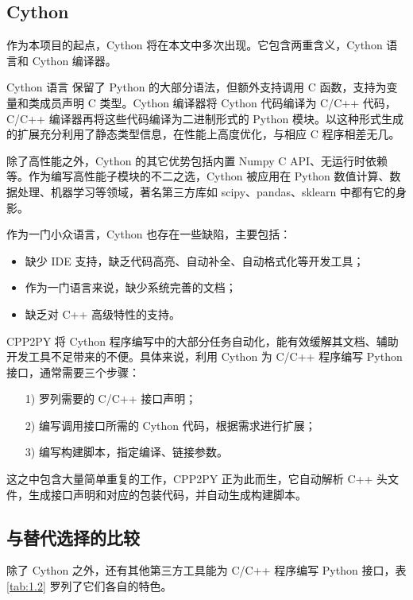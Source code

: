 \subsection{Cython}

作为本项目的起点，Cython 将在本文中多次出现。它包含两重含义，Cython 语言和 Cython 编译器。

Cython 语言\cite{O2015Cython, cython} 保留了 Python 的大部分语法，但额外支持调用 C 函数，支持为变量和类成员声明 C 类型。Cython 编译器将 Cython 代码编译为 C/C++ 代码，C/C++ 编译器再将这些代码编译为二进制形式的 Python 模块。以这种形式生成的扩展充分利用了静态类型信息，在性能上高度优化，与相应 C 程序相差无几。

除了高性能之外，Cython 的其它优势包括内置 Numpy C API、无运行时依赖等。作为编写高性能子模块的不二之选，Cython 被应用在 Python 数值计算、数据处理、机器学习等领域，著名第三方库如 scipy、pandas、sklearn 中都有它的身影。

作为一门小众语言，Cython 也存在一些缺陷，主要包括：

\begin{itemize}
    \item 缺少 IDE 支持，缺乏代码高亮、自动补全、自动格式化等开发工具；
    \item 作为一门语言来说，缺少系统完善的文档；
    \item 缺乏对 C++ 高级特性的支持。
\end{itemize}

CPP2PY 将 Cython 程序编写中的大部分任务自动化，能有效缓解其文档、辅助开发工具不足带来的不便。具体来说，利用 Cython 为 C/C++ 程序编写 Python 接口，通常需要三个步骤：

\begin{itemize}
    \item [1)] 罗列需要的 C/C++ 接口声明；
    \item [2)] 编写调用接口所需的 Cython 代码，根据需求进行扩展；
    \item [3)] 编写构建脚本，指定编译、链接参数。
\end{itemize}

这之中包含大量简单重复的工作，CPP2PY 正为此而生，它自动解析 C++ 头文件，生成接口声明和对应的包装代码，并自动生成构建脚本。

\subsection{与替代选择的比较}

除了 Cython 之外，还有其他第三方工具能为 C/C++ 程序编写 Python 接口，表 \ref{tab:1.2} 罗列了它们各自的特色\cite{msdnexperiment, cythonothers}。

